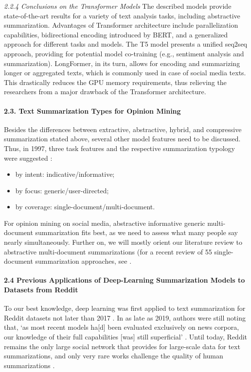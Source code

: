 \textit{2.2.4 Conclusions on the Transformer Models}
The described models provide state-of-the-art results for a variety of text analysis tasks, including abstractive summarization. Advantages of Transformer architecture include parallelization capabilities, bidirectional encoding introduced by BERT, and a generalized approach for different tasks and models. The T5 model presents a unified seq2seq approach, providing for potential model co-training (e.g., sentiment analysis and summarization). LongFormer, in its turn, allows for encoding and summarizing longer or aggregated texts, which is commonly used in case of social media texts. This drastically reduces the GPU memory requirements, thus relieving the researchers from a major drawback of the Transformer architecture.

\paragraph{2.3. Text Summarization Types for Opinion Mining}
Besides the differences between extractive, abstractive, hybrid, and compressive \cite{TorresMoreno} summarization stated above, several other model features need to be discussed. Thus, in 1997, three task features and the respective summarization typology were suggested \cite{Hand}:
\begin{itemize}
	\item by intent: indicative/informative;
	\item by focus: generic/user-directed;
	\item by coverage: single-document/multi-document.
\end{itemize}
For opinion mining on social media, abstractive informative generic multi-document summarization fits best, as we need to assess what many people say nearly simultaneously. Further on, we will mostly orient our literature review to abstractive multi-document summarizations (for a recent review of 55 single-document summarization approaches, see \cite{SyedVolskeLipka}.

\paragraph{2.4 Previous Applications of Deep-Learning Summarization Models to Datasets from Reddit}
To our best knowledge, deep learning was first applied to text summarization for Reddit datasets not later than 2017 \cite{VolskePotthastSyed}. In as late as 2019, authors \cite{SyedYousefAlKhatib} were still noting that, ‘as most recent models ha[d] been evaluated exclusively on news corpora, our knowledge of their full capabilities [was] still superficial’ \cite[p.~524]{SyedVolskeLipka}. Until today, Reddit remains the only large social network that provides for large-scale data for text summarizations, and only very rare works challenge the quality of human summarizations \cite{BommasaniCardie}.

